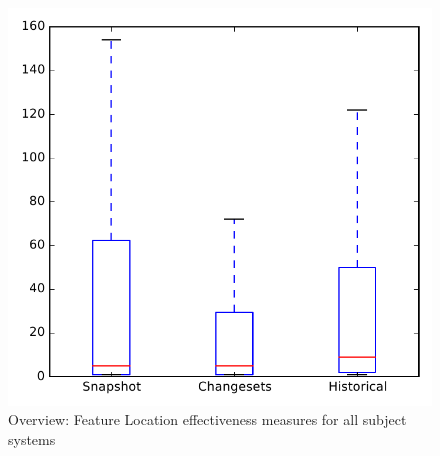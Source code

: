 
\begin{figure}
\centering
\includegraphics[height=0.4\textheight]{figures/flt/all_overview_no_outlier}
\caption{Overview: Feature Location effectiveness measures for all subject systems}
\label{fig:flt:all:overview}
\end{figure}
